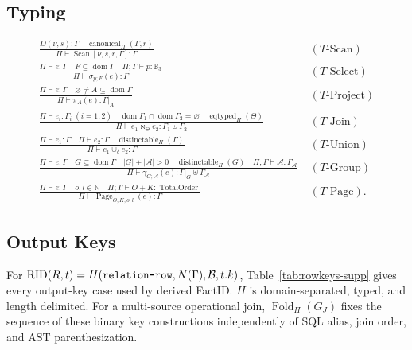 \documentclass[journal,onecolumn]{IEEEtran}
\newcommand{\code}[1]{\texttt{\detokenize{#1}}}
\begin{document}
\subsection{Typing}

\begingroup\small
\begin{align*}
\frac{D(\nu,s):\Gamma\quad \operatorname{canonical}_\Pi(\Gamma,r)}
 {\Pi\vdash\operatorname{Scan}[\nu,s,r,\Gamma]:\Gamma}
&\;(T\text{-Scan})\\[1mm]
\frac{\Pi\vdash e:\Gamma\quad F\subseteq\operatorname{dom}\Gamma
      \quad \Pi;\Gamma\vdash p:\mathbb B_3}
 {\Pi\vdash\sigma_{p;F}(e):\Gamma}
&\;(T\text{-Select})\\[1mm]
\frac{\Pi\vdash e:\Gamma\quad \varnothing\ne A\subseteq\operatorname{dom}\Gamma}
 {\Pi\vdash\pi_A(e):\Gamma|_A}
&\;(T\text{-Project})\\[1mm]
\frac{\Pi\vdash e_i:\Gamma_i\;(i=1,2)\quad
      \operatorname{dom}\Gamma_1\cap\operatorname{dom}\Gamma_2=\varnothing
      \quad\operatorname{eqtyped}_\Pi(\Theta)}
 {\Pi\vdash e_1\bowtie_\Theta e_2:\Gamma_1\uplus\Gamma_2}
&\;(T\text{-Join})\\[1mm]
\frac{\Pi\vdash e_1:\Gamma\quad\Pi\vdash e_2:\Gamma
      \quad\operatorname{distinctable}_\Pi(\Gamma)}
 {\Pi\vdash e_1\cup_\delta e_2:\Gamma}
&\;(T\text{-Union})\\[1mm]
\frac{\Pi\vdash e:\Gamma\quad G\subseteq\operatorname{dom}\Gamma
      \quad |G|+|\mathcal A|>0\quad
      \operatorname{distinctable}_\Pi(G)\quad
      \Pi;\Gamma\vdash\mathcal A:\Gamma_{\mathcal A}}
 {\Pi\vdash\gamma_{G;\mathcal A}(e):\Gamma|_G\uplus\Gamma_{\mathcal A}}
&\;(T\text{-Group})\\[1mm]
\frac{\Pi\vdash e:\Gamma\quad o,l\in\mathbb N\quad
      \Pi;\Gamma\vdash O{+}K:\operatorname{TotalOrder}}
 {\Pi\vdash\operatorname{Page}_{O,K,o,l}(e):\Gamma}
&\;(T\text{-Page}).
\end{align*}
\endgroup

\subsection{Output Keys}

For $\operatorname{RID}(R,t)=H(\code{relation-row},N(\Gamma),\mathcal B,t.k)$,
Table~\ref{tab:rowkeys-supp} gives every output-key case used by derived FactID.
$H$ is domain-separated, typed, and length delimited.  For a multi-source
operational join, $\operatorname{Fold}_\Pi(G_J)$ fixes the sequence of these
binary key constructions independently of SQL alias, join order, and AST
parenthesization.
\end{document}
